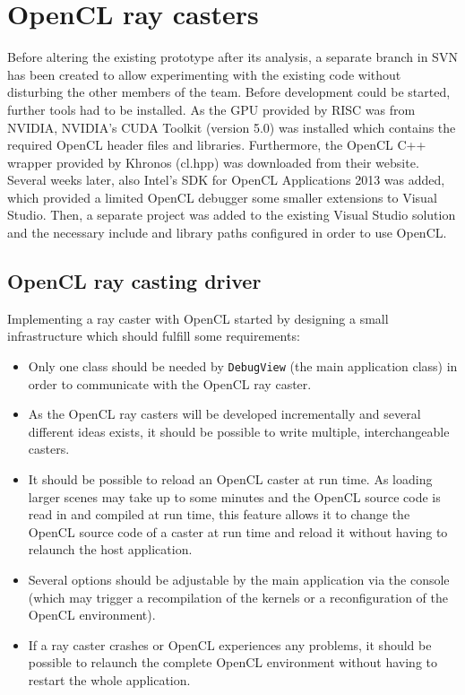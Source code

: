 \section{OpenCL ray casters}
\label{sec:opencl_caster}

Before altering the existing prototype after its analysis, a separate branch in SVN has been created to allow experimenting with the existing code without disturbing the other members of the team. Before development could be started, further tools had to be installed. As the GPU provided by RISC was from NVIDIA, NVIDIA's CUDA Toolkit (version 5.0) was installed which contains the required OpenCL header files and libraries. Furthermore, the OpenCL C++ wrapper provided by Khronos (cl.hpp) was downloaded from their website. Several weeks later, also Intel's SDK for OpenCL Applications 2013 was added, which provided a limited OpenCL debugger some smaller extensions to Visual Studio. Then, a separate project was added to the existing Visual Studio solution and the necessary include and library paths configured in order to use OpenCL.

\subsection{OpenCL ray casting driver}

Implementing a ray caster with OpenCL started by designing a small infrastructure which should fulfill some requirements:

\begin{itemize}
	\item Only one class should be needed by \lstinline!DebugView! (the main application class) in order to communicate with the OpenCL ray caster.
	\item As the OpenCL ray casters will be developed incrementally and several different ideas exists, it should be possible to write multiple, interchangeable casters.
	\item It should be possible to reload an OpenCL caster at run time. As loading larger scenes may take up to some minutes and the OpenCL source code is read in and compiled at run time, this feature allows it to change the OpenCL source code of a caster at run time and reload it without having to relaunch the host application.
	\item Several options should be adjustable by the main application via the console (which may trigger a recompilation of the kernels or a reconfiguration of the OpenCL environment).
	\item If a ray caster crashes or OpenCL experiences any problems, it should be possible to relaunch the complete OpenCL environment without having to restart the whole application. 
\end{itemize}

